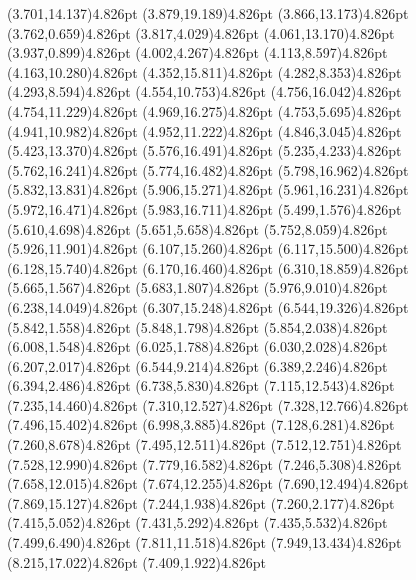 \documentclass[10pt]{article}
\begin{document}
{{\qdisk(3.701,14.137){4.826pt}%
\qdisk(3.879,19.189){4.826pt}%
\qdisk(3.866,13.173){4.826pt}%
\qdisk(3.762,0.659){4.826pt}%
\qdisk(3.817,4.029){4.826pt}%
\qdisk(4.061,13.170){4.826pt}%
\qdisk(3.937,0.899){4.826pt}%
\qdisk(4.002,4.267){4.826pt}%
\qdisk(4.113,8.597){4.826pt}%
\qdisk(4.163,10.280){4.826pt}%
\qdisk(4.352,15.811){4.826pt}%
\qdisk(4.282,8.353){4.826pt}%
\qdisk(4.293,8.594){4.826pt}%
\qdisk(4.554,10.753){4.826pt}%
\qdisk(4.756,16.042){4.826pt}%
\qdisk(4.754,11.229){4.826pt}%
\qdisk(4.969,16.275){4.826pt}%
\qdisk(4.753,5.695){4.826pt}%
\qdisk(4.941,10.982){4.826pt}%
\qdisk(4.952,11.222){4.826pt}%
\qdisk(4.846,3.045){4.826pt}%
\qdisk(5.423,13.370){4.826pt}%
\qdisk(5.576,16.491){4.826pt}%
\qdisk(5.235,4.233){4.826pt}%
\qdisk(5.762,16.241){4.826pt}%
\qdisk(5.774,16.482){4.826pt}%
\qdisk(5.798,16.962){4.826pt}%
\qdisk(5.832,13.831){4.826pt}%
\qdisk(5.906,15.271){4.826pt}%
\qdisk(5.961,16.231){4.826pt}%
\qdisk(5.972,16.471){4.826pt}%
\qdisk(5.983,16.711){4.826pt}%
\qdisk(5.499,1.576){4.826pt}%
\qdisk(5.610,4.698){4.826pt}%
\qdisk(5.651,5.658){4.826pt}%
\qdisk(5.752,8.059){4.826pt}%
\qdisk(5.926,11.901){4.826pt}%
\qdisk(6.107,15.260){4.826pt}%
\qdisk(6.117,15.500){4.826pt}%
\qdisk(6.128,15.740){4.826pt}%
\qdisk(6.170,16.460){4.826pt}%
\qdisk(6.310,18.859){4.826pt}%
\qdisk(5.665,1.567){4.826pt}%
\qdisk(5.683,1.807){4.826pt}%
\qdisk(5.976,9.010){4.826pt}%
\qdisk(6.238,14.049){4.826pt}%
\qdisk(6.307,15.248){4.826pt}%
\qdisk(6.544,19.326){4.826pt}%
\qdisk(5.842,1.558){4.826pt}%
\qdisk(5.848,1.798){4.826pt}%
\qdisk(5.854,2.038){4.826pt}%
\qdisk(6.008,1.548){4.826pt}%
\qdisk(6.025,1.788){4.826pt}%
\qdisk(6.030,2.028){4.826pt}%
\qdisk(6.207,2.017){4.826pt}%
\qdisk(6.544,9.214){4.826pt}%
\qdisk(6.389,2.246){4.826pt}%
\qdisk(6.394,2.486){4.826pt}%
\qdisk(6.738,5.830){4.826pt}%
\qdisk(7.115,12.543){4.826pt}%
\qdisk(7.235,14.460){4.826pt}%
\qdisk(7.310,12.527){4.826pt}%
\qdisk(7.328,12.766){4.826pt}%
\qdisk(7.496,15.402){4.826pt}%
\qdisk(6.998,3.885){4.826pt}%
\qdisk(7.128,6.281){4.826pt}%
\qdisk(7.260,8.678){4.826pt}%
\qdisk(7.495,12.511){4.826pt}%
\qdisk(7.512,12.751){4.826pt}%
\qdisk(7.528,12.990){4.826pt}%
\qdisk(7.779,16.582){4.826pt}%
\qdisk(7.246,5.308){4.826pt}%
\qdisk(7.658,12.015){4.826pt}%
\qdisk(7.674,12.255){4.826pt}%
\qdisk(7.690,12.494){4.826pt}%
\qdisk(7.869,15.127){4.826pt}%
\qdisk(7.244,1.938){4.826pt}%
\qdisk(7.260,2.177){4.826pt}%
\qdisk(7.415,5.052){4.826pt}%
\qdisk(7.431,5.292){4.826pt}%
\qdisk(7.435,5.532){4.826pt}%
\qdisk(7.499,6.490){4.826pt}%
\qdisk(7.811,11.518){4.826pt}%
\qdisk(7.949,13.434){4.826pt}%
\qdisk(8.215,17.022){4.826pt}%
\qdisk(7.409,1.922){4.826pt}%
}}
\end{document}
